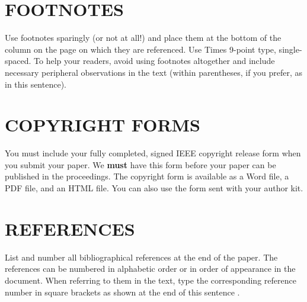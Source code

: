 \documentclass{article}
\begin{document}
\vfill
\pagebreak


\section{FOOTNOTES}
\label{sec:foot}

Use footnotes sparingly (or not at all!) and place them at the bottom of the
column on the page on which they are referenced. Use Times 9-point type,
single-spaced. To help your readers, avoid using footnotes altogether and
include necessary peripheral observations in the text (within parentheses, if
you prefer, as in this sentence).


\section{COPYRIGHT FORMS}
\label{sec:copyright}

You must include your fully completed, signed IEEE copyright release form when
you submit your paper. We {\bf must} have this form before your paper can be
published in the proceedings.  The copyright form is available as a Word file,
a PDF file, and an HTML file. You can also use the form sent with your author
kit.

\section{REFERENCES}
\label{sec:ref}

List and number all bibliographical references at the end of the paper.  The references can be numbered in alphabetic order or in order of appearance in the document.  When referring to them in the text, type the corresponding reference number in square brackets as shown at the end of this sentence \cite{C2}.



\end{document}
